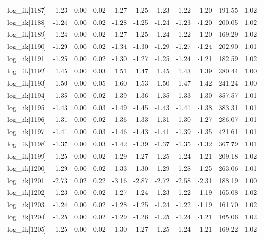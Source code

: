 \begin{table}[ht]
\begin{tabular}{rrrrrrrrrrr}
  log\_lik[1187] & -1.23 & 0.00 & 0.02 & -1.27 & -1.25 & -1.23 & -1.22 & -1.20 & 191.55 & 1.02 \\ 
  log\_lik[1188] & -1.24 & 0.00 & 0.02 & -1.28 & -1.25 & -1.24 & -1.23 & -1.20 & 200.05 & 1.02 \\ 
  log\_lik[1189] & -1.24 & 0.00 & 0.02 & -1.27 & -1.25 & -1.24 & -1.22 & -1.20 & 169.29 & 1.02 \\ 
  log\_lik[1190] & -1.29 & 0.00 & 0.02 & -1.34 & -1.30 & -1.29 & -1.27 & -1.24 & 202.90 & 1.01 \\ 
  log\_lik[1191] & -1.25 & 0.00 & 0.02 & -1.30 & -1.27 & -1.25 & -1.24 & -1.21 & 182.59 & 1.02 \\ 
  log\_lik[1192] & -1.45 & 0.00 & 0.03 & -1.51 & -1.47 & -1.45 & -1.43 & -1.39 & 380.44 & 1.00 \\ 
  log\_lik[1193] & -1.50 & 0.00 & 0.05 & -1.60 & -1.53 & -1.50 & -1.47 & -1.42 & 241.24 & 1.00 \\ 
  log\_lik[1194] & -1.35 & 0.00 & 0.02 & -1.39 & -1.36 & -1.35 & -1.33 & -1.30 & 357.57 & 1.01 \\ 
  log\_lik[1195] & -1.43 & 0.00 & 0.03 & -1.49 & -1.45 & -1.43 & -1.41 & -1.38 & 383.31 & 1.01 \\ 
  log\_lik[1196] & -1.31 & 0.00 & 0.02 & -1.36 & -1.33 & -1.31 & -1.30 & -1.27 & 286.07 & 1.01 \\ 
  log\_lik[1197] & -1.41 & 0.00 & 0.03 & -1.46 & -1.43 & -1.41 & -1.39 & -1.35 & 421.61 & 1.01 \\ 
  log\_lik[1198] & -1.37 & 0.00 & 0.03 & -1.42 & -1.39 & -1.37 & -1.35 & -1.32 & 367.79 & 1.01 \\ 
  log\_lik[1199] & -1.25 & 0.00 & 0.02 & -1.29 & -1.27 & -1.25 & -1.24 & -1.21 & 209.18 & 1.02 \\ 
  log\_lik[1200] & -1.29 & 0.00 & 0.02 & -1.33 & -1.30 & -1.29 & -1.28 & -1.25 & 263.06 & 1.01 \\ 
  log\_lik[1201] & -2.73 & 0.02 & 0.22 & -3.16 & -2.87 & -2.72 & -2.58 & -2.31 & 188.19 & 1.00 \\ 
  log\_lik[1202] & -1.23 & 0.00 & 0.02 & -1.27 & -1.24 & -1.23 & -1.22 & -1.19 & 165.08 & 1.02 \\ 
  log\_lik[1203] & -1.24 & 0.00 & 0.02 & -1.28 & -1.25 & -1.24 & -1.22 & -1.19 & 161.70 & 1.02 \\ 
  log\_lik[1204] & -1.25 & 0.00 & 0.02 & -1.29 & -1.26 & -1.25 & -1.24 & -1.21 & 165.06 & 1.02 \\ 
  log\_lik[1205] & -1.25 & 0.00 & 0.02 & -1.30 & -1.27 & -1.25 & -1.24 & -1.21 & 169.22 & 1.02 \\ 

\end{tabular}
\end{table}
